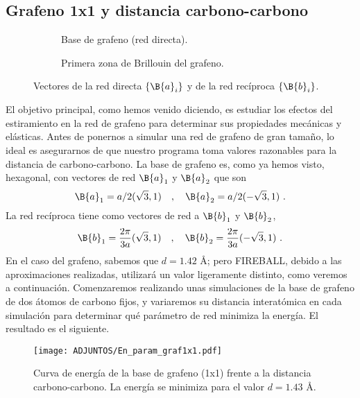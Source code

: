 \subsection{Grafeno 1x1 y distancia carbono-carbono}

\begin{figure}[htbp]
    \centering
    \begin{subfigure}{0.41\textwidth}
        \centering
        \def\svgwidth{.8\textwidth}
        
        \caption{Base de grafeno (red directa).}
    \end{subfigure}
    \begin{subfigure}{0.41\textwidth}
        \centering
        \def\svgwidth{.8\textwidth}
        
        \caption{Primera zona de Brillouin del grafeno.}
    \end{subfigure}
    \caption{Vectores de la red directa $\{ \B{a}_i \}$ y de la red recíproca $\{ \B{b}_i \}$.}
    \label{fig:4.2}
\end{figure}

El objetivo principal, como hemos venido diciendo, es estudiar los efectos del estiramiento en la red de grafeno para determinar sus propiedades mecánicas y elásticas. Antes de ponernos a simular una red de grafeno de gran tamaño, lo ideal es asegurarnos de que nuestro programa toma valores razonables para la distancia de carbono-carbono. La base de grafeno es, como ya hemos visto, hexagonal, con vectores de red $\B{a}_1$ y $\B{a}_2$ que son
\begin{equation}
    \B{a}_1 = a/2 (\sqrt{3}, 1) \quad , \quad \B{a}_2 = a/2 (-\sqrt{3},1) \ .
\end{equation}
La red recíproca tiene como vectores de red a $\B{b}_1$ y $\B{b}_2$, 
\begin{equation}
    \B{b}_1 = \frac{2\pi }{3a} (\sqrt{3}, 1) \quad , \quad \B{b}_2 = \frac{2\pi }{3a} (-\sqrt{3},1) \ .
\end{equation}
En el caso del grafeno, sabemos que $d = 1.42$ \AA; pero FIREBALL, debido a las aproximaciones realizadas, utilizará un valor ligeramente distinto, como veremos a continuación. Comenzaremos realizando unas simulaciones de la base de grafeno de dos átomos de carbono fijos, y variaremos su distancia interatómica en cada simulación para determinar qué parámetro de red minimiza la energía. El resultado es el siguiente.

\begin{figure}[!h]
    \centering
    \texttt{[image: ADJUNTOS/En\_param\_graf1x1.pdf]}
    \caption{Curva de energía de la base de grafeno (1x1) frente a la distancia carbono-carbono. La energía se minimiza para el valor $d = 1.43$ \AA.}
    \label{fig:4.3}
\end{figure}

